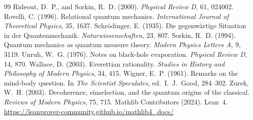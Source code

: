 \documentclass[12pt,a4paper]{article}
\begin{document}
\begin{thebibliography}{99}
 Rideout, D.~P., and Sorkin, R.~D. (2000). \textit{Physical Review D}, 61, 024002.
 Rovelli, C. (1996). Relational quantum mechanics. \textit{International Journal of Theoretical Physics}, 35, 1637.
 Schr\"odinger, E. (1935). Die gegenw\"artige Situation in der Quantenmechanik. \textit{Naturwissenschaften}, 23, 807.
 Sorkin, R.~D. (1994). Quantum mechanics as quantum measure theory. \textit{Modern Physics Letters A}, 9, 3119.
 Unruh, W.~G. (1976). Notes on black-hole evaporation. \textit{Physical Review D}, 14, 870.
 Wallace, D. (2003). Everettian rationality. \textit{Studies in History and Philosophy of Modern Physics}, 34, 415.
 Wigner, E.~P. (1961). Remarks on the mind-body question. In \textit{The Scientist Speculates}, ed.\ I.~J.\ Good, 284--302.
 Zurek, W.~H. (2003). Decoherence, einselection, and the quantum origins of the classical. \textit{Reviews of Modern Physics}, 75, 715.
 Mathlib Contributors (2024). Lean~4. \url{https://leanprover-community.github.io/mathlib4_docs/}
\end{thebibliography}
\end{document}
